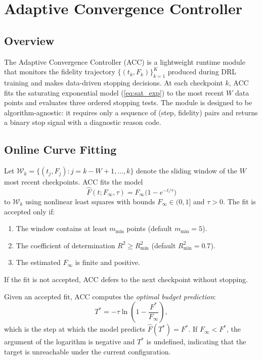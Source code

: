 \section{Adaptive Convergence Controller}
\label{sec:acc}

\subsection{Overview}

The Adaptive Convergence Controller (ACC) is a lightweight runtime module that monitors
the fidelity trajectory $\{(t_k, F_k)\}_{k=1}^{K}$ produced during DRL training and
makes data-driven stopping decisions. At each checkpoint $k$, ACC fits the saturating
exponential model (\cref{eq:sat_exp}) to the most recent $W$ data points and evaluates
three ordered stopping tests. The module is designed to be algorithm-agnostic: it
requires only a sequence of (step, fidelity) pairs and returns a binary stop signal
with a diagnostic reason code.

\subsection{Online Curve Fitting}

Let $\mathcal{W}_k = \{(t_j, F_j) : j = k-W+1, \ldots, k\}$ denote the sliding window
of the $W$ most recent checkpoints. ACC fits the model
\begin{equation}
  \hat{F}(t; F_\infty, \tau) = F_\infty \bigl(1 - e^{-t/\tau}\bigr)
  \label{eq:model}
\end{equation}
to $\mathcal{W}_k$ using nonlinear least squares with bounds $F_\infty \in (0, 1]$
and $\tau > 0$. The fit is accepted only if:
\begin{enumerate}
  \item The window contains at least $m_{\min}$ points (default $m_{\min} = 5$).
  \item The coefficient of determination $R^2 \geq R^2_{\min}$ (default $R^2_{\min} = 0.7$).
  \item The estimated $F_\infty$ is finite and positive.
\end{enumerate}
If the fit is not accepted, ACC defers to the next checkpoint without stopping.

Given an accepted fit, ACC computes the \emph{optimal budget prediction}:
\begin{equation}
  T^* = -\tau \ln\!\left(1 - \frac{F^*}{F_\infty}\right),
  \label{eq:T_star}
\end{equation}
which is the step at which the model predicts $\hat{F}(T^*) = F^*$. If $F_\infty < F^*$,
the argument of the logarithm is negative and $T^*$ is undefined, indicating that the
target is unreachable under the current configuration.

